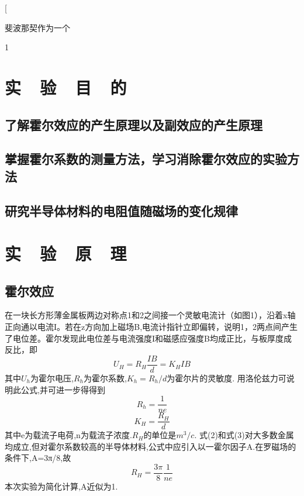 \documentclass{thuemp}
\begin{document}



\twocolumn[
\begin{@twocolumnfalse}
\maketitle

\begin{empAbstract}
斐波那契作为一个
\end{empAbstract}

\end{@twocolumnfalse}
1
\wuhao 

\section{实~~验~~目~~的}
\subsection{了解霍尔效应的产生原理以及副效应的产生原理}
\subsection{掌握霍尔系数的测量方法，学习消除霍尔效应的实验方法}
\subsection{研究半导体材料的电阻值随磁场的变化规律}

\section{实~~验~~原~~理}
\subsection{霍尔效应}
在一块长方形薄金属板两边对称点1和2之间接一个灵敏电流计（如图1），沿着x轴
正向通以电流I。若在z方向加上磁场B,电流计指针立即偏转，说明1，2两点间产生
了电位差。霍尔发现此电位差与电流强度I和磁感应强度B均成正比，与板厚度成反比，即
\[U_{H}=R_{H}\frac{IB}{d}=K_{H}IB\]
其中$U_{h}$为霍尔电压,$R_{h}$为霍尔系数,$K_{h}=R_{h}/d$为霍尔片的灵敏度.
用洛伦兹力可说明此公式,并可进一步得得到
\[R_{h}=\frac{1}{ne}\]
\[K_{H}=\frac{R_{H}}{d}\]
其中e为载流子电荷,n为载流子浓度.$R_{H}$的单位是$m^{3}/c$.
式(2)和式(3)对大多数金属均成立,但对霍尔系数较高的半导体材料,公式中应引入以一霍尔因子A.在罗磁场的条件下,A=3π/8,故
\[R_{H}=\frac{3\pi}{8}\frac{1}{ne}\]
本次实验为简化计算,A近似为1.
\end{document}
